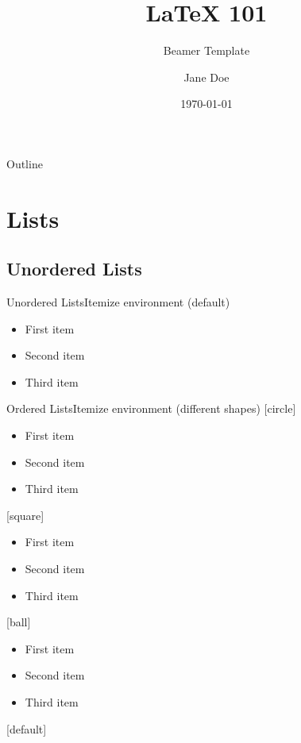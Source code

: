 \documentclass{beamer}
\title {\LaTeX{} 101}
\subtitle{Beamer Template}
\author{Jane Doe}
\institute{UC Davis GradPathways}
\date{\today}
\begin{document}
\begin{frame}
	\titlepage
\end{frame}

\label{Outline}
\begin{frame}{Outline}
	\tableofcontents
\end{frame}

\section{Lists}

\subsection{Unordered Lists}

\begin{frame}{Unordered Lists}{Itemize environment (default)}
\begin{itemize}
    \item First item
    \item Second item
    \item Third item
\end{itemize}
\end{frame}

\begin{frame}{Ordered Lists}{Itemize environment (different shapes)}
[circle]
\begin{itemize}
    \item First item
    \item Second item
    \item Third item
\end{itemize}

[square]
\begin{itemize}
    \item First item
    \item Second item
    \item Third item
\end{itemize}

[ball]
\begin{itemize}
    \item First item
    \item Second item
    \item Third item
\end{itemize}

[default] %

\end{frame}
\end{document}
